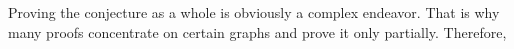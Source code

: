 Proving the conjecture as a whole is obviously a complex endeavor. That is why many proofs concentrate on certain graphs and prove it only partially. Therefore,